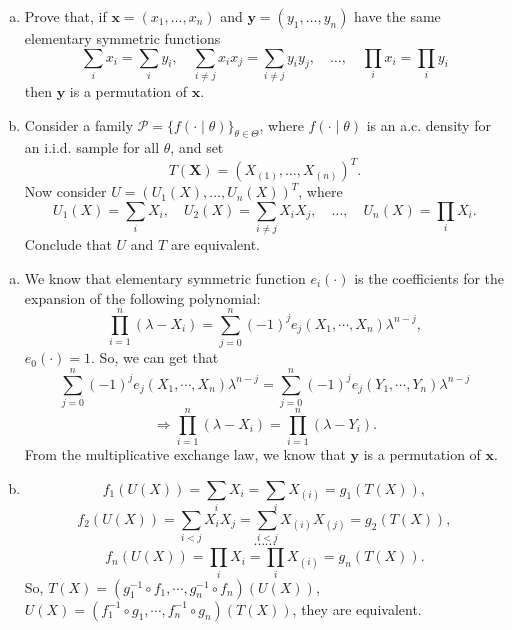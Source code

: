 \begin{ex}
    \begin{enumerate}[(a)]
        \item Prove that, if \(\mathbf{x}=\left(x_{1}, \ldots, x_{n}\right)\) and \(\mathbf{y}=\left(y_{1}, \ldots, y_{n}\right)\) have the same elementary symmetric functions
        \[
            \sum_{i} x_{i}=\sum_{i} y_{i}, \quad \sum_{i \neq j} x_{i} x_{j}=\sum_{i \neq j} y_{i} y_{j}, \quad \ldots, \quad \prod_{i} x_{i}=\prod_{i} y_{i}
        \]
        then \(\mathbf{y}\) is a permutation of \(\mathbf{x}\). 
        \item Consider a family \(\mathcal{P}=\{f(\cdot \mid \theta)\}_{\theta \in \Theta}\), where \(f(\cdot \mid \theta)\) is an a.c. density for an i.i.d. sample for all \(\theta\), and set
        \[
            T(\mathbf{X})=\left(X_{(1)}, \ldots, X_{(n)}\right)^T .
        \]
        Now consider \(U=\left(U_{1}(X), \ldots, U_{n}(X)\right)^T\), where
        \[
            U_{1}(X)=\sum_{i} X_{i}, \quad U_{2}(X)=\sum_{i \neq j} X_{i} X_{j}, \quad \ldots, \quad U_{n}(X)=\prod_{i} X_{i} .
        \]
        Conclude that \(U\) and \(T\) are equivalent. 
    \end{enumerate}
\end{ex}

\begin{solution}
    \begin{enumerate}[(a)]
        \item We know that elementary symmetric function $e_i(\cdot)$ is the coefficients for the expansion of the following polynomial: 
        \[
            \prod_{i=1}^n(\lambda-X_i)=\sum_{j=0}^n(-1)^je_j(X_1,\cdots,X_n)\lambda^{n-j}, 
        \]
        $e_0(\cdot)=1$. So, we can get that 
        \[
            \sum_{j=0}^n(-1)^je_j(X_1,\cdots,X_n)\lambda^{n-j}=\sum_{j=0}^n(-1)^je_j(Y_1,\cdots,Y_n)\lambda^{n-j}
        \]
        \[
            \Rightarrow \prod_{i=1}^n(\lambda-X_i)=\prod_{i=1}^n(\lambda-Y_i). 
        \]
        From the multiplicative exchange law, we know that \(\mathbf{y}\) is a permutation of \(\mathbf{x}\). 
        \item 
        \[
            f_1(U(X))=\sum_iX_i=\sum_iX_{(i)}=g_1(T(X)), 
        \]
        \[
            f_2(U(X))=\sum_{i<j}X_iX_j=\sum_{i<j}X_{(i)}X_{(j)}=g_2(T(X)), 
        \]
        \[
            \cdots\cdots
        \]
        \[
            f_n(U(X))=\prod_{i}X_i=\prod_{i}X_{(i)}=g_n(T(X)). 
        \]
        So, $T(X)=(g_1^{-1}\circ f_1,\cdots,g_n^{-1}\circ f_n)(U(X))$, $U(X)=(f_1^{-1}\circ g_1,\cdots,f_n^{-1}\circ g_n)(T(X))$, they are equivalent. 
    \end{enumerate}
\end{solution}

